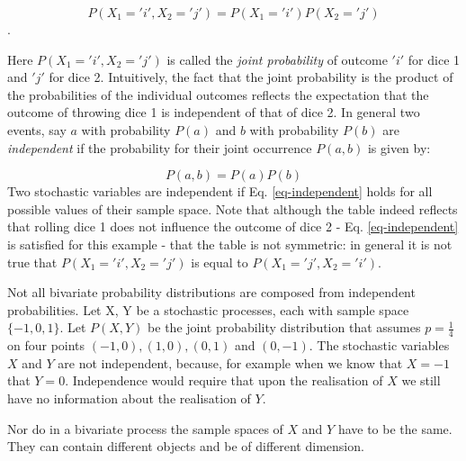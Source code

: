   $$P(X_1 = 'i' ,X_2 = 'j') = P(X_1 = 'i')P(X_2 ='j')$$.

  Here $P(X_1 = 'i' , X_2 = 'j')$ is called the \emph{joint probability} of outcome
  $'i'$ for dice 1 and $'j'$ for dice 2.  
  Intuitively, the fact that the joint probability is the product of the probabilities
  of the individual outcomes reflects
  the expectation that the outcome of throwing dice 1 is independent of that
  of dice 2. In general two events, say  $a$ with probability  $P(a)$
  and $b$ with probability  $P(b)$ are \emph{independent} if the probability for their
  joint occurrence $P(a,b)$ is given by:
  
  \begin{equation}
    P(a, b) = P(a)P(b)
    \label{eq-independent}
  \end{equation}
  Two stochastic variables are independent if Eq. \ref{eq-independent} holds for
  all possible values of their sample space. Note that although the table indeed reflects that
  rolling dice 1 does not influence the outcome of dice 2 - Eq. \ref{eq-independent} is satisfied
  for this example - that the table is not symmetric: in general it is not true that
  $P(X_1 = 'i', X_2 = 'j')$ is equal to $P(X_1 = 'j', X_2 = 'i')$. 
  
  Not all bivariate probability distributions are composed from independent probabilities. Let X, Y be
  a stochastic processes, each with sample space $\{ -1,0, 1 \}$. Let
    $P(X,Y)$ be the joint probability distribution that assumes $p= \frac{1}{4}$ on four
    points $(-1, 0), (1, 0), (0, 1)$ and $(0,-1)$. The stochastic variables $X$ and $Y$
    are not independent, because, for example when we know that $X=-1$ that $Y=0$.
    Independence would require that upon the realisation of $X$ we still have no
    information about the realisation of $Y$.

    Nor do in a bivariate process the sample spaces of $X$ and $Y$ have to be the same.
    They can contain different objects and be of different dimension.
  

